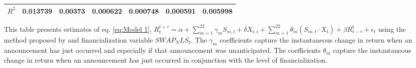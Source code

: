 \begin{sidewaystable}
{\begin{tabular}{@{}lllllllllllll@{}}
                \\ \textbf{$R^2$}             &\multicolumn{2}{c}{ 0.013739 }                                                 & \multicolumn{2}{c}{ 0.00373 }                                                 & \multicolumn{2}{c}{ 0.000622 }                                                 & \multicolumn{2}{c}{ 0.000748 }                                                 & \multicolumn{2}{c}{ 0.000591 }                                                   & \multicolumn{2}{c}{ 0.005998 }                                                 \\ \bottomrule 
\end{tabular}
}
\begin{tablenotes}\item 
    \singlespacing
    \footnotesize
    This table presents estimates of eq. \ref{eq:Model 1}, $R_{t}^{t+\tau}=\alpha+\sum_{m=1}^{22} \gamma_m S_{m,t}+ \delta X_{t,i} + \sum_{m=1}^{22} \theta_m (S_{m,t} \cdot X_t)+\beta R_{t-\tau}^{t}+\epsilon_{t}$ using the method proposed by \citet{kurov2019price} and financialization variable $SWAP_NLS_t$. The $\gamma_m$ coefficients capture the instantaneous change in return when an announcement has just occurred and especially if that announcement was unanticipated. The coefficients $\theta_m$ capture the instantaneous change in return when an announcement has just occurred in conjunction with the level of financialization.
\end{tablenotes}
\end{sidewaystable}
